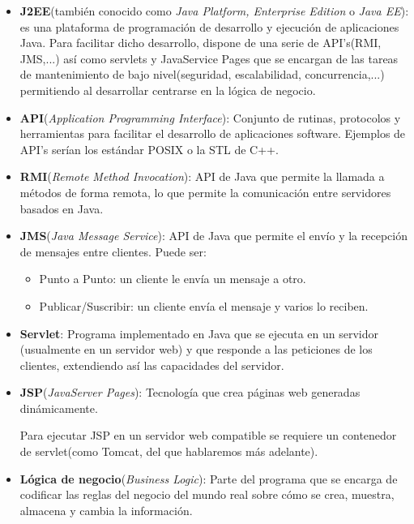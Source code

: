 \documentclass[a4paper, 10pt]{article}
\begin{document}
	\begin{itemize}
		\item \textbf{J2EE}(también conocido como \textit{Java Platform, Enterprise
		Edition} o \textit{Java EE}): es una plataforma de programación de desarrollo y
		ejecución de aplicaciones Java. Para facilitar dicho desarrollo, dispone de una
		serie de API's(RMI, JMS,...) así como servlets y JavaService Pages que se encargan
		de las tareas de mantenimiento de bajo nivel(seguridad, escalabilidad,
		concurrencia,...) permitiendo al desarrollar centrarse en la lógica de negocio.\cite{J2EE_Def}
		
		\item \textbf{API}(\textit{Application Programming Interface}): Conjunto de rutinas,
		protocolos y herramientas para facilitar el desarrollo de aplicaciones software.
		Ejemplos de API's serían los estándar POSIX o la STL de C++.\cite{API_Def}
		
		\item \textbf{RMI}(\textit{Remote Method Invocation}): API de Java que permite la
		llamada a métodos de forma remota, lo que permite la comunicación entre servidores
		basados en Java.\cite{RMI_Def}
		
		\item \textbf{JMS}(\textit{Java Message Service}): API de Java que permite el envío
		y la recepción de mensajes entre clientes.\cite{JMS_Def} Puede ser:
		\begin{itemize}
			\item Punto a Punto: un cliente le envía un mensaje a otro.
			\item Publicar/Suscribir: un cliente envía el mensaje y varios lo reciben.
		\end{itemize}

		\item \textbf{Servlet}: Programa implementado en Java que se ejecuta en un servidor
		(usualmente en un servidor web) y que responde a las peticiones de los clientes,
		extendiendo así las capacidades del servidor.\cite{Servlet_Def}
		
		\item \textbf{JSP}(\textit{JavaServer Pages}): Tecnología que crea páginas web
		generadas dinámicamente.\cite{JSP_Def}
		
		Para ejecutar JSP en un servidor web compatible se requiere un contenedor de
		servlet(como Tomcat, del que hablaremos más adelante).
		
		\item \textbf{Lógica de negocio}(\textit{Business Logic}): Parte del programa
		que se encarga de codificar las reglas del negocio del mundo real sobre cómo
		se crea, muestra, almacena y cambia la información.\cite{BL_Def}
		
	\end{itemize}
\end{document}
